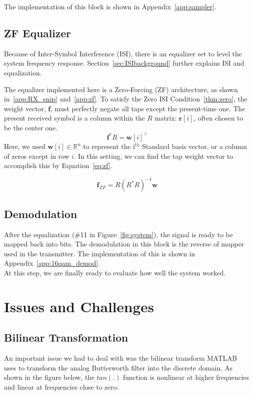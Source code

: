 \documentclass[]{article}
\begin{document}
The implementation of this block is shown in Appendix~\ref{app:sampler}.

\subsection{ZF Equalizer}
\label{sec:equal}
Because of Inter-Symbol Interference (ISI), there is an equalizer set to level the system frequency response.  Section~\ref{sec:ISIbackground} further explains ISI and equalization.

The equalizer implemented here is a Zero-Forcing (ZF) architecture, as shown in~\ref{app:RX_snip} and~\ref{app:zf}. To satisfy the Zero ISI Condition~\ref{thm:zero}, the weight vector, $\mathbf{f}$, must perfectly negate all taps except the present-time one.  The present received symbol is a column within the $R$ matrix: $\mathbf{r}[i]$, often chosen to be the center one.  
$$ \mathbf{f}^{\ast}R = \mathbf{w}[i]^{\top} $$
Here, we used  $\mathbf{w} [i] \in \mathbb{R}^n$ to represent the i$^{th}$ Standard basis vector, or a column of zeros except in row $i$.  In this setting, we can find the tap weight vector to accomplish this by Equation~\ref{eq:zf}. 

\begin{equation}
\label{eq:zf} 
\mathbf{f}_{ZF} = R \left(R^{\ast}R \right)^{-1} \mathbf{w}
\end{equation}

\subsection{Demodulation}
\label{sec:demod}
After the equalization (\#11 in Figure~\ref{fig:system}), the signal is ready to be mapped back into bits.  The demodulation in this block is the reverse of mapper used in the transmitter.  The implementation of this is shown in Appendix~\ref{app:16qam_demod}.  \\

At this step, we are finally ready to evaluate how well the system worked.

\section{Issues and Challenges}
\label{sec:issues}
\subsection{Bilinear Transformation}
An important issue we had to deal with was the bilinear transform MATLAB uses to transform the analog Butterworth filter into the discrete domain.  As shown in the figure below, the $tan(.)$ function is nonlinear at higher frequencies and linear at frequencies close to zero:
\end{document}
